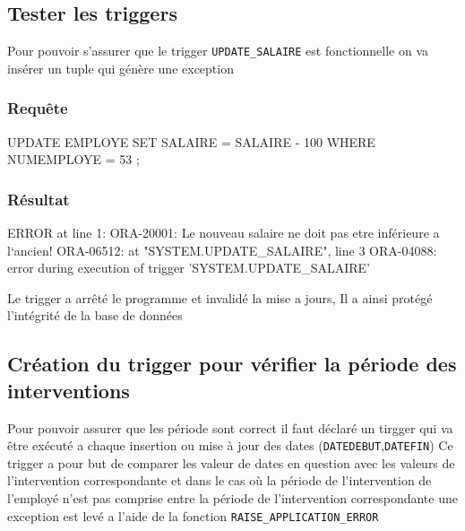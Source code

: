 \documentclass[•]{article}
\begin{document}
\subsection{Tester les triggers}
Pour pouvoir s'assurer que le trigger \texttt{UPDATE\_SALAIRE} est fonctionnelle on va insérer un tuple qui génère une exception
\subsubsection{Requête}
\begin{sql}
UPDATE EMPLOYE SET SALAIRE = SALAIRE - 100 WHERE NUMEMPLOYE = 53 ;
\end{sql}

\subsubsection{Résultat}
\begin{sql}
ERROR at line 1:
ORA-20001: Le nouveau salaire ne doit pas etre inférieure a l`ancien!
ORA-06512: at "SYSTEM.UPDATE_SALAIRE", line 3
ORA-04088: error during execution of trigger 'SYSTEM.UPDATE_SALAIRE'
\end{sql}

Le trigger a arrêté le programme et invalidé la mise a jours, Il a ainsi protégé l'intégrité de la base de données

\subsection{Création du trigger pour vérifier la période des interventions}

Pour pouvoir assurer que les période sont correct il faut déclaré un tirgger qui va être exécuté a chaque insertion ou mise à jour des dates (\texttt{DATEDEBUT},\texttt{DATEFIN})
Ce trigger a pour but de comparer les valeur de dates en question avec les valeurs de l'intervention correspondante 
et dans le cas où la période de l'intervention de l'employé n'est pas comprise entre la période de l'intervention correspondante une exception est levé
a l'aide de la fonction \texttt{RAISE\_APPLICATION\_ERROR}
\end{document}
